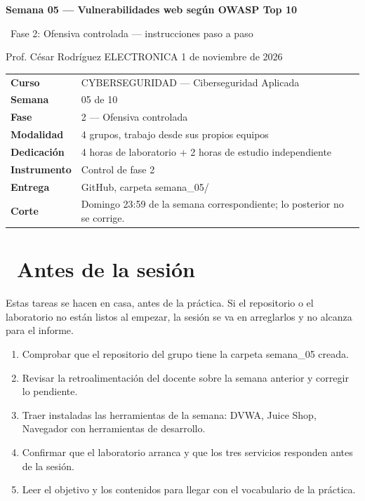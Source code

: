 \documentclass[11pt,a4paper]{article}
\newcommand{\iconoBanda}{microchip}
\newcommand{\bandaTitulo}[3][fondoOscuro]{%
  \begin{tcolorbox}[
    enhanced,
    colback=#1, colframe=#1,
    boxrule=0pt, arc=8pt, outer arc=8pt,
    width=\linewidth,
    top=18pt, bottom=6pt, left=14pt, right=14pt,
    borderline south={3.5pt}{0pt}{cyanNeon},
  ]
    \begin{minipage}[c]{0.07\linewidth}
      \centering
      \textcolor{cyanNeon}{\fontsize{30}{30}\selectfont\faIcon{\iconoBanda}}
    \end{minipage}%
    \hspace{8pt}%
    \begin{minipage}[c]{0.88\linewidth}
      {\fontsize{20}{24}\selectfont\bfseries\color{white}#2}\par\vspace{5pt}%
      \textcolor{cyanNeon!80!white}{\small\faIcon{angle-right}~#3}%
    \end{minipage}
    \vspace{4pt}
  \end{tcolorbox}%
  \vspace{8pt}%
}
\newcommand{\iconotexto}[2]{\textcolor{cyanNeon}{\faIcon{#1}}~#2}
\renewcommand{\iconoBanda}{shield-alt}
\begin{document}
\bandaTitulo[fondoOscuro]{Semana 05 --- Vulnerabilidades web según OWASP Top 10}{Fase 2: Ofensiva controlada --- instrucciones paso a paso}

\begin{center}\small\color{grisTexto}Prof. César Rodríguez \textbar{} ELECTRONICA \textbar{} 1 de noviembre de 2026\end{center}

\begin{tabularx}{\linewidth}{@{}>{\raggedright\arraybackslash}p{4.6cm}X@{}}
\toprule
\textbf{Curso} & CYBERSEGURIDAD --- Ciberseguridad Aplicada \\
\textbf{Semana} & 05 de 10 \\
\textbf{Fase} & 2 --- Ofensiva controlada \\
\textbf{Modalidad} & 4 grupos, trabajo desde sus propios equipos \\
\textbf{Dedicación} & 4 horas de laboratorio + 2 horas de estudio independiente \\
\textbf{Instrumento} & Control de fase 2 \\
\textbf{Entrega} & GitHub, carpeta semana\_05/ \\
\textbf{Corte} & Domingo 23:59 de la semana correspondiente; lo posterior no se corrige. \\
\bottomrule
\end{tabularx}

\section{\iconotexto{clock}{Antes de la sesión}}

Estas tareas se hacen en casa, antes de la práctica. Si el repositorio o el laboratorio no están listos al empezar, la sesión se va en arreglarlos y no alcanza para el informe.

\begin{enumerate}[leftmargin=1.4em,itemsep=2pt,topsep=3pt]
  \item Comprobar que el repositorio del grupo tiene la carpeta semana\_05 creada.
  \item Revisar la retroalimentación del docente sobre la semana anterior y corregir lo pendiente.
  \item Traer instaladas las herramientas de la semana: DVWA, Juice Shop, Navegador con herramientas de desarrollo.
  \item Confirmar que el laboratorio arranca y que los tres servicios responden antes de la sesión.
  \item Leer el objetivo y los contenidos para llegar con el vocabulario de la práctica.
\end{enumerate}
\end{document}
